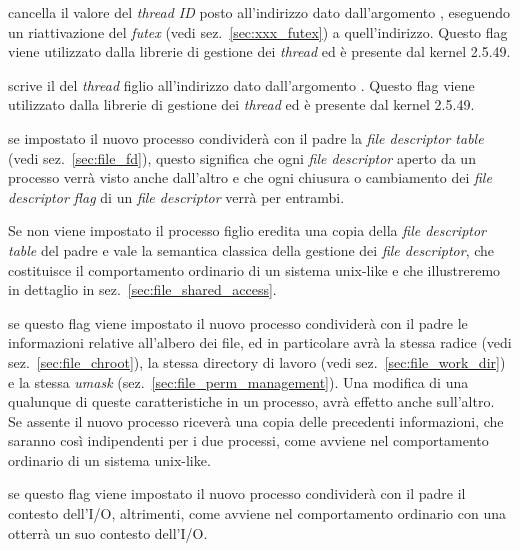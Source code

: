 \begin{basedescript}{\desclabelwidth{1.5 cm}\desclabelstyle{\nextlinelabel}}

\item[\constd{CLONE\_CHILD\_CLEARTID}] cancella il valore del \textit{thread
    ID} posto all'indirizzo dato dall'argomento , eseguendo un
  riattivazione del \textit{futex} (vedi sez.~\ref{sec:xxx_futex}) a
  quell'indirizzo. Questo flag viene utilizzato dalla librerie di gestione dei
  \textit{thread} ed è presente dal kernel 2.5.49.

\item[\constd{CLONE\_CHILD\_SETTID}] scrive il  del \textit{thread}
  figlio all'indirizzo dato dall'argomento . Questo flag viene
  utilizzato dalla librerie di gestione dei \textit{thread} ed è presente dal
  kernel 2.5.49.

\item[\constd{CLONE\_FILES}] se impostato il nuovo processo condividerà con il
  padre la \textit{file descriptor table} (vedi sez.~\ref{sec:file_fd}),
  questo significa che ogni \textit{file descriptor} aperto da un processo
  verrà visto anche dall'altro e che ogni chiusura o cambiamento dei
  \textit{file descriptor flag} di un \textit{file descriptor} verrà per
  entrambi.

  Se non viene impostato il processo figlio eredita una copia della
  \textit{file descriptor table} del padre e vale la semantica classica della
  gestione dei \textit{file descriptor}, che costituisce il comportamento
  ordinario di un sistema unix-like e che illustreremo in dettaglio in
  sez.~\ref{sec:file_shared_access}.

\item[\constd{CLONE\_FS}] se questo flag viene impostato il nuovo processo
  condividerà con il padre le informazioni relative all'albero dei file, ed in
  particolare avrà la stessa radice (vedi sez.~\ref{sec:file_chroot}), la
  stessa directory di lavoro (vedi sez.~\ref{sec:file_work_dir}) e la stessa
  \textit{umask} (sez.~\ref{sec:file_perm_management}). Una modifica di una
  qualunque di queste caratteristiche in un processo, avrà effetto anche
  sull'altro. Se assente il nuovo processo riceverà una copia delle precedenti
  informazioni, che saranno così indipendenti per i due processi, come avviene
  nel comportamento ordinario di un sistema unix-like.

\item[\constd{CLONE\_IO}] se questo flag viene impostato il nuovo processo
  condividerà con il padre il contesto dell'I/O, altrimenti, come avviene nel
  comportamento ordinario con una  otterrà un suo contesto
  dell'I/O.


\end{basedescript}
